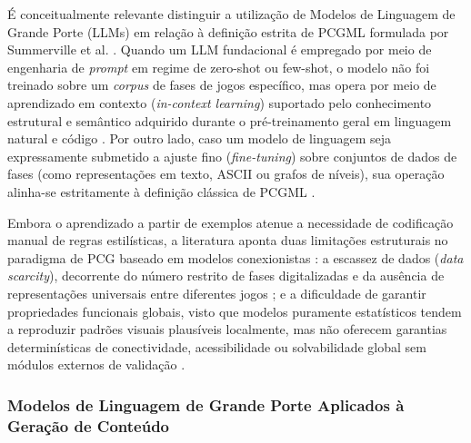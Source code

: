É conceitualmente relevante distinguir a utilização de Modelos de Linguagem de Grande Porte (LLMs) em relação à definição estrita de PCGML formulada por Summerville et al. \cite{summerville2018procedural}. Quando um LLM fundacional é empregado por meio de engenharia de \textit{prompt} em regime de zero-shot ou few-shot, o modelo não foi treinado sobre um \textit{corpus} de fases de jogos específico, mas opera por meio de aprendizado em contexto (\textit{in-context learning}) suportado pelo conhecimento estrutural e semântico adquirido durante o pré-treinamento geral em linguagem natural e código \cite{brown2020language, Gallotta_2024}. Por outro lado, caso um modelo de linguagem seja expressamente submetido a ajuste fino (\textit{fine-tuning}) sobre conjuntos de dados de fases (como representações em texto, ASCII ou grafos de níveis), sua operação alinha-se estritamente à definição clássica de PCGML \cite{summerville2018procedural, todd2023level}.

Embora o aprendizado a partir de exemplos atenue a necessidade de codificação manual de regras estilísticas, a literatura aponta duas limitações estruturais no paradigma de PCG baseado em modelos conexionistas \cite{summerville2018procedural, maleki2024procedural, her2025zeroshot3dmapgeneration}: a escassez de dados (\textit{data scarcity}), decorrente do número restrito de fases digitalizadas e da ausência de representações universais entre diferentes jogos \cite{summerville2018procedural}; e a dificuldade de garantir propriedades funcionais globais, visto que modelos puramente estatísticos tendem a reproduzir padrões visuais plausíveis localmente, mas não oferecem garantias determinísticas de conectividade, acessibilidade ou solvabilidade global sem módulos externos de validação \cite{summerville2018procedural, maleki2024procedural}.

\subsubsection{Modelos de Linguagem de Grande Porte Aplicados à Geração de Conteúdo}
\label{sec:llms_pcg}

